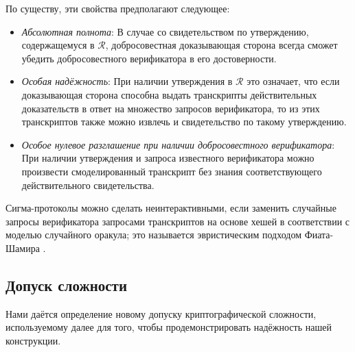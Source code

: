 \documentclass{article}
\theoremstyle{definition}
\begin{document}
По существу, эти свойства предполагают следующее:
\begin{itemize}
\item \textit{Абсолютная полнота}: В случае со свидетельством по утверждению, содержащемуся в $\mathcal{R}$, добросовестная доказывающая сторона всегда сможет убедить добросовестного верификатора в его достоверности.
\item \textit{Особая надёжность}: При наличии утверждения в $\mathcal{R}$ это означает, что если доказывающая сторона способна выдать транскрипты действительных доказательств в ответ на множество запросов верификатора, то из этих транскриптов также можно извлечь и свидетельство по такому утверждению.
\item \textit{Особое нулевое разглашение при наличии добросовестного верификатора}: При наличии утверждения и запроса известного верификатора можно произвести смоделированный транскрипт без знания соответствующего действительного свидетельства.
\end{itemize}
Сигма-протоколы можно сделать неинтерактивными, если заменить случайные запросы верификатора запросами транскриптов на основе хешей в соответствии с моделью случайного оракула; это называется эвристическим подходом Фиата-Шамира \cite{fiat}.


\subsection{Допуск сложности}
Нами даётся определение новому допуску криптографической сложности, используемому далее для того, чтобы продемонстрировать надёжность нашей конструкции.
\end{document}
